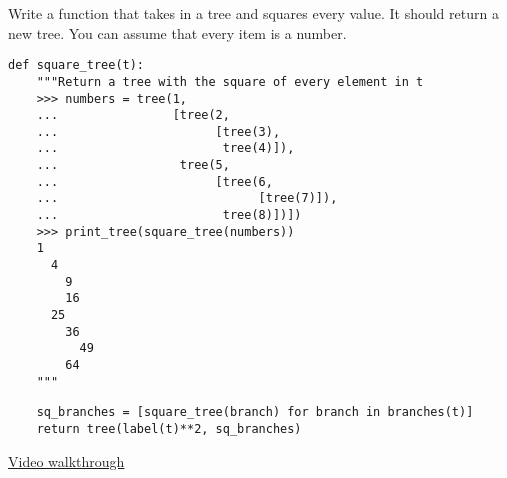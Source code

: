 \question
Write a function that takes in a tree and squares every value. It should
return a new tree. You can assume that every item is a number.
\begin{lstlisting}
def square_tree(t):
    """Return a tree with the square of every element in t
    >>> numbers = tree(1,
    ...                [tree(2,
    ...                      [tree(3),
    ...                       tree(4)]),
    ...                 tree(5,
    ...                      [tree(6,
    ...                            [tree(7)]),
    ...                       tree(8)])])
    >>> print_tree(square_tree(numbers))
    1
      4
        9
        16
      25
        36
          49
        64
    """

\end{lstlisting}
\begin{solution}[1.5in]
\begin{lstlisting}
    sq_branches = [square_tree(branch) for branch in branches(t)]
    return tree(label(t)**2, sq_branches)
\end{lstlisting}
\href{https://www.youtube.com/watch?v=cZWnevsmb5o&index=2&list=PLx38hZJ5RLZcgrSJp16YmzNwn9hL5JD8q&t=5m3s}{Video walkthrough}
\end{solution}
